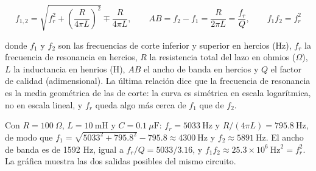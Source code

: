 \documentclass[11pt,letterpaper]{article}
\begin{document}
\begin{equation}
  f_{1,2} = \sqrt{f_r^{2} + \left(\frac{R}{4\pi L}\right)^{2}} \mp \frac{R}{4\pi L}, \qquad AB = f_2 - f_1 = \frac{R}{2\pi L} = \frac{f_r}{Q}, \qquad f_1 f_2 = f_r^{2}
\end{equation}

donde $f_1$ y $f_2$ son las frecuencias de corte inferior y superior en hercios (Hz), $f_r$ la frecuencia de resonancia en hercios, $R$ la resistencia total del lazo en ohmios (\ensuremath{\Omega}), $L$ la inductancia en henrios (H), $AB$ el ancho de banda en hercios y $Q$ el factor de calidad (adimensional). La última relación dice que la frecuencia de resonancia es la media geométrica de las de corte: la curva es simétrica en escala logarítmica, no en escala lineal, y $f_r$ queda algo más cerca de $f_1$ que de $f_2$.

Con $R = 100\ \Omega$, $L = 10\ \text{mH}$ y $C = 0.1\ \mu\text{F}$: $f_r = 5033\ \text{Hz}$ y $R/(4\pi L) = 795.8\ \text{Hz}$, de modo que $f_1 = \sqrt{5033^2 + 795.8^2} - 795.8 \approx 4300\ \text{Hz}$ y $f_2 \approx 5891\ \text{Hz}$. El ancho de banda es de 1592 Hz, igual a $f_r/Q = 5033/3.16$, y $f_1 f_2 \approx 25.3 \times 10^6\ \text{Hz}^2 = f_r^2$. La gráfica muestra las dos salidas posibles del mismo circuito.
\end{document}
